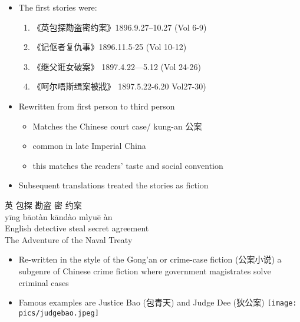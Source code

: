 \documentclass[a4paper,landscape,headrule,footrule,xetex]{foils}
\begin{document}
\begin{itemize}\addtolength{\itemsep}{-1ex}
\item The first stories were:
  \begin{enumerate}
  \item 《英包探勘盗密约案》1896.9.27--10.27 (Vol 6-9) 
  \item  《记伛者复仇事》1896.11.5-25 (Vol 10-12)   
  \item  《继父诳女破案》 1897.4.22—5.12 (Vol 24-26) 
\item  《呵尔唔斯缉案被戕》 1897.5.22-6.20 Vol27-30) 
\end{enumerate}
\item  Rewritten from first person to third person
  \begin{itemize}
  \item Matches the Chinese court case/ kung-an 公案
  \item common in late Imperial China
  \item this matches the readers' taste and social convention
  \end{itemize}
\item Subsequent translations treated the stories as fiction

\end{itemize}



\begin{exe}
\ex   \glll 英 包探 勘盗 密 约案\\
  yīng bāotàn kāndào  mìyuē àn \\
  English detective steal secret agreement \\
  
 \trans The Adventure of the Naval Treaty
  \end{exe}

  \begin{itemize}
  \item Re-written in the style of the Gong'an or crime-case fiction
    (公案小说)  a subgenre of Chinese crime fiction where government
    magistrates solve criminal cases
  \item Famous examples are Justice Bao (包青天) 
    and Judge Dee (狄公案)
\texttt{[image: pics/judgebao.jpeg]}

\end{itemize}
\end{document}
